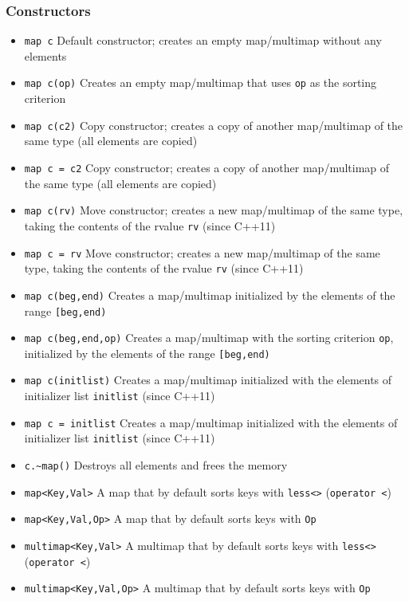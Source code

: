 \documentclass{report}
\begin{document}
\bigbreak \noindent 
\subsubsection{Constructors}
\begin{itemize}
    \item \texttt{map c} Default constructor; creates an empty map/multimap without any elements
    \item \texttt{map c(op)} Creates an empty map/multimap that uses \texttt{op} as the sorting criterion
    \item \texttt{map c(c2)} Copy constructor; creates a copy of another map/multimap of the same type (all elements are copied)
    \item \texttt{map c = c2} Copy constructor; creates a copy of another map/multimap of the same type (all elements are copied)
    \item \texttt{map c(rv)} Move constructor; creates a new map/multimap of the same type, taking the contents of the rvalue \texttt{rv} (since C++11)
    \item \texttt{map c = rv} Move constructor; creates a new map/multimap of the same type, taking the contents of the rvalue \texttt{rv} (since C++11)
    \item \texttt{map c(beg,end)} Creates a map/multimap initialized by the elements of the range \texttt{[beg,end)}
    \item \texttt{map c(beg,end,op)} Creates a map/multimap with the sorting criterion \texttt{op}, initialized by the elements of the range \texttt{[beg,end)}
    \item \texttt{map c(initlist)} Creates a map/multimap initialized with the elements of initializer list \texttt{initlist} (since C++11)
    \item \texttt{map c = initlist} Creates a map/multimap initialized with the elements of initializer list \texttt{initlist} (since C++11)
    \item \texttt{c.\~{}map()} Destroys all elements and frees the memory
\end{itemize}
\bigbreak \noindent
\begin{itemize}
    \item \texttt{map<Key,Val>} A map that by default sorts keys with \texttt{less<>} (\texttt{operator <})
    \item \texttt{map<Key,Val,Op>} A map that by default sorts keys with \texttt{Op}
    \item \texttt{multimap<Key,Val>} A multimap that by default sorts keys with \texttt{less<>} (\texttt{operator <})
    \item \texttt{multimap<Key,Val,Op>} A multimap that by default sorts keys with \texttt{Op}
\end{itemize}
\end{document}
